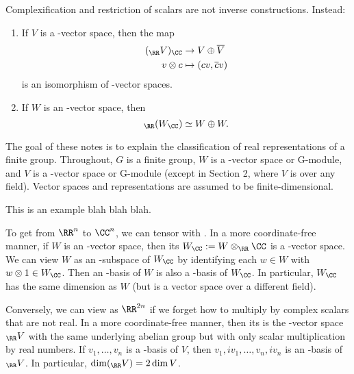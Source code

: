\documentclass{scrartcl}
\begin{document}
Complexification and restriction of scalars are not inverse constructions. Instead:
\begin{proposition}
    \hfill
    \begin{enumerate}[font=\normalfont]
        \item If $V$ is a \CC-vector space, then the map \begin{align*}
            (_{\RR} V)_{\CC} &\rightarrow V \oplus \ol{V} \\
            v\otimes c &\mapsto (cv,\ol{c}v) \\
        \end{align*} is an isomorphism of \CC-vector spaces.
        \item If $W$ is an \RR-vector space, then \[_{\RR}(W_{\CC}) \simeq W\oplus W.\]
    \end{enumerate}
\end{proposition}


The goal of these notes is to explain the classification of real representations of a finite
group. Throughout, $G$ is a finite group, $W$ is a \RR-vector space or \RR G-module, and $V$ is a
\CC-vector space or \CC G-module (except in Section 2, where $V$ is over any field). Vector spaces
and representations are assumed to be finite-dimensional.

\begin{example}
    This is an example blah blah blah. 
\end{example}

To get from $\RR^n$ to $\CC^n$, we can tensor with \CC. In a more coordinate-free
manner, if $W$ is an \RR-vector space, then its  $W_{\CC} := W \otimes_{\RR} \CC$ is a \CC-vector
space. We can view $W$ as an \RR-subspace of $W_{\CC}$ by identifying each $w \in W$ with $w \otimes 1 \in W_{\CC}$.
Then an \RR-basis of $W$ is also a \CC-basis of $W_{\CC}$. In particular, $W_{\CC}$ has the same dimension as
$W$ (but is a vector space over a different field).

Conversely, we can view \CC[n] as $\RR^{2n}$ if we forget how to multiply by complex scalars that are not real. In a more coordinate-free manner, then its  is the \RR-vector space $_{\RR} V$ with the same underlying abelian group but with only scalar multiplication by real numbers. If $v_1,\dots,v_n$ is a \CC-basis of $V$, then $v_1, iv_1,\dots,v_n,iv_n$ is an \RR-basis of $_{\RR} V$. In particular, $\dim(_{\RR} V) = 2\dim V$.
\end{document}
